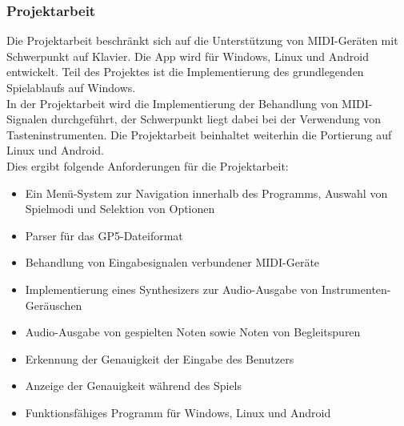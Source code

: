 \documentclass[12pt,a4paper]{report}
\begin{document}
      		\subsubsection{Projektarbeit}
      Die Projektarbeit beschränkt sich auf die Unterstützung von MIDI-Geräten mit Schwerpunkt auf Klavier.
      Die App wird für Windows, Linux und Android entwickelt.
      Teil des Projektes ist die Implementierung des grundlegenden Spielablaufs auf Windows. \\
      In der Projektarbeit wird die Implementierung der Behandlung von MIDI-Signalen durchgeführt, der Schwerpunkt liegt dabei bei der Verwendung von Tasteninstrumenten. Die Projektarbeit beinhaltet weiterhin die Portierung auf Linux und Android. \\
      Dies ergibt folgende Anforderungen für die Projektarbeit: \\
      		\begin{itemize}
      		\item Ein Menü-System zur Navigation innerhalb des Programms, Auswahl von Spielmodi und Selektion von Optionen
      		\item Parser für das GP5-Dateiformat
      		\item Behandlung von Eingabesignalen verbundener MIDI-Geräte
      		\item Implementierung eines Synthesizers zur Audio-Ausgabe von Instrumenten-Geräuschen
			\item Audio-Ausgabe von gespielten Noten sowie Noten von Begleitspuren   
			\item Erkennung der Genauigkeit der Eingabe des Benutzers
			\item Anzeige der Genauigkeit während des Spiels
			\item Funktionsfähiges Programm für Windows, Linux und Android
			\end{itemize}
\end{document}
